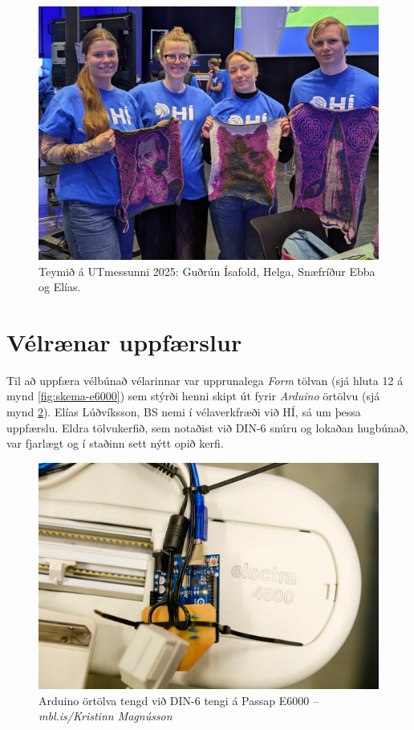 \documentclass[a4paper,10pt,twocolumn]{article}
\begin{document}
\begin{figure}
    \centering
    \includegraphics[width=\linewidth]{figs/hidef-team.png}
    \caption{Teymið á UTmessunni 2025: Guðrún Ísafold, Helga, Snæfríður Ebba og Elías.}
    \label{fig:team}
\end{figure}


\section{Vélrænar uppfærslur}
Til að uppfæra vélbúnað vélarinnar var upprunalega \emph{Form} tölvan (sjá hluta 12 á mynd \ref{fig:skema-e6000}) sem stýrði henni skipt út fyrir \emph{Arduino} örtölvu (sjá mynd \ref{fig:arduino}). Elías Lúðvíksson, BS nemi í vélaverkfræði við HÍ, sá um þessa uppfærslu. Eldra tölvukerfið, sem notaðist við DIN-6 snúru og lokaðan hugbúnað, var fjarlægt og í staðinn sett nýtt opið kerfi.

\begin{figure}
    \centering
    \includegraphics[width=\linewidth]{figs/arduino.jpg}
    \caption{Arduino örtölva tengd við DIN-6 tengi á Passap E6000 -- \textit{mbl.is/Kristinn Magnússon}}
    \label{fig:arduino}
\end{figure}
\end{document}
